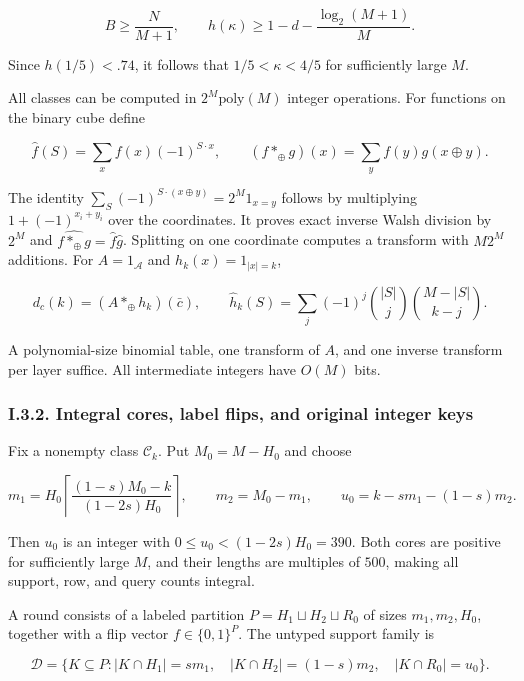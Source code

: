 \[
B\ge\frac N{M+1},\qquad
h(\kappa)\ge1-d-\frac{\log_2(M+1)}M.
\tag{73}
\]

Since \(h(1/5)<.74\), it follows that \(1/5<\kappa<4/5\) for sufficiently large \(M\).

All classes can be computed in \(2^M\mathrm{poly}(M)\) integer operations. For functions on the binary cube define

\[
\widehat f(S)=\sum_xf(x)(-1)^{S\cdot x},\qquad
(f*_{\oplus}g)(x)=\sum_yf(y)g(x\oplus y).
\]

The identity \(\sum_S(-1)^{S\cdot(x\oplus y)}=2^M1_{x=y}\) follows by multiplying \(1+(-1)^{x_i+y_i}\) over the coordinates. It proves exact inverse Walsh division by \(2^M\) and \(\widehat{f*_{\oplus}g}=\widehat f\widehat g\). Splitting on one coordinate computes a transform with \(M2^M\) additions. For \(A=1_{\mathcal A}\) and \(h_k(x)=1_{|x|=k}\),

\[
d_c(k)=(A*_{\oplus}h_k)(\bar c),\qquad
\widehat h_k(S)=\sum_j(-1)^j\binom{|S|}j\binom{M-|S|}{k-j}.
\tag{74}
\]

A polynomial-size binomial table, one transform of \(A\), and one inverse transform per layer suffice. All intermediate integers have \(O(M)\) bits.

\hypertarget{af-a9ec399514-i.3.2.-integral-cores-label-flips-and-original-integer-keys}{%
\subsubsection{I.3.2. Integral cores, label flips, and original integer keys}\label{af-a9ec399514-i.3.2.-integral-cores-label-flips-and-original-integer-keys}}

Fix a nonempty class \(\mathcal C_k\). Put \(M_0=M-H_0\) and choose

\[
m_1=H_0\left\lceil
\frac{(1-s)M_0-k}{(1-2s)H_0}\right\rceil,
\qquad m_2=M_0-m_1,
\qquad u_0=k-sm_1-(1-s)m_2.
\tag{75}
\]

Then \(u_0\) is an integer with \(0\le u_0<(1-2s)H_0=390\). Both cores are positive for sufficiently large \(M\), and their lengths are multiples of \(500\), making all support, row, and query counts integral.

A round consists of a labeled partition \(P=H_1\sqcup H_2\sqcup R_0\) of sizes \(m_1,m_2,H_0\), together with a flip vector \(f\in\{0,1\}^P\). The untyped support family is

\[
\mathcal D=\{K\subseteq P:
|K\cap H_1|=sm_1,\quad
|K\cap H_2|=(1-s)m_2,\quad
|K\cap R_0|=u_0\}.
\]

